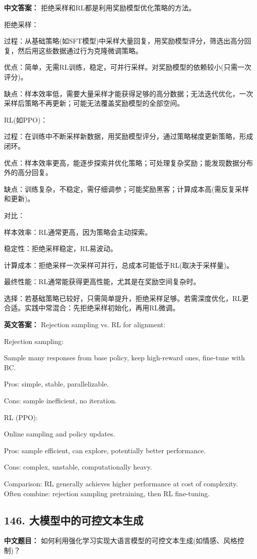 \documentclass[10pt,a4paper]{ctexart}
\begin{document}
\textbf{中文答案：}
拒绝采样和RL都是利用奖励模型优化策略的方法。

拒绝采样：

过程：从基础策略(如SFT模型)中采样大量回复，用奖励模型评分，筛选出高分回复，然后用这些数据通过行为克隆微调策略。

优点：简单，无需RL训练，稳定，可并行采样。对奖励模型的依赖较小(只需一次评分)。

缺点：样本效率低，需要大量采样才能获得足够的高分数据；无法迭代优化，一次采样后策略不再更新；可能无法覆盖奖励模型的全部空间。

RL(如PPO)：

过程：在训练中不断采样新数据，用奖励模型评分，通过策略梯度更新策略，形成闭环。

优点：样本效率更高，能逐步探索并优化策略；可处理复杂奖励；能发现数据分布外的高分回复。

缺点：训练复杂，不稳定，需仔细调参；可能奖励黑客；计算成本高(需反复采样和更新)。

对比：

样本效率：RL通常更高，因为策略会主动探索。

稳定性：拒绝采样稳定，RL易波动。

计算成本：拒绝采样一次采样可并行，总成本可能低于RL(取决于采样量)。

最终性能：RL通常能获得更高性能，尤其是在奖励空间复杂时。

选择：若基础策略已较好，只需简单提升，拒绝采样足够。若需深度优化，RL更合适。实践中常混合：先拒绝采样初始化，再用RL微调。

\textbf{英文答案：}
Rejection sampling vs. RL for alignment:

Rejection sampling:

Sample many responses from base policy, keep high-reward ones, fine-tune with BC.

Pros: simple, stable, parallelizable.

Cons: sample inefficient, no iteration.

RL (PPO):

Online sampling and policy updates.

Pros: sample efficient, can explore, potentially better performance.

Cons: complex, unstable, computationally heavy.

Comparison: RL generally achieves higher performance at cost of complexity. Often combine: rejection sampling pretraining, then RL fine-tuning.

\subsection*{146. 大模型中的可控文本生成}
\textbf{中文题目：} 如何利用强化学习实现大语言模型的可控文本生成(如情感、风格控制)？
\end{document}
